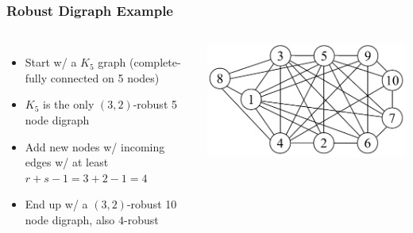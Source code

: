 \documentclass{beamer}
\begin{document}

\begin{frame}
\frametitle{Robust Digraph Example}

\begin{columns}[c] %

\begin{itemize}
\item Start w/ a $K_5$ graph (complete-fully connected on 5 nodes)
\item $K_5$ is the only $(3,2)$-robust 5 node digraph 
\item Add new nodes w/ incoming edges w/ at least $r+s-1=3+2-1=4$
\item End up w/ a $(3,2)$-robust 10 node digraph, also $4$-robust
\end{itemize}

    
    \includegraphics[scale=0.38]{figures/RobustDigraph.png}
	\centering \\
	\cite{p1}
\end{columns}


\end{frame}

\end{document}
